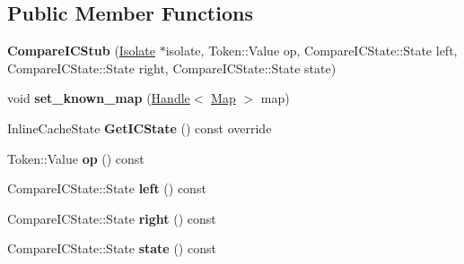 \subsection*{Public Member Functions}
\begin{DoxyCompactItemize}
\item 
{\bfseries Compare\+I\+C\+Stub} (\hyperlink{classv8_1_1internal_1_1_isolate}{Isolate} $\ast$isolate, Token\+::\+Value op, Compare\+I\+C\+State\+::\+State left, Compare\+I\+C\+State\+::\+State right, Compare\+I\+C\+State\+::\+State state)\hypertarget{classv8_1_1internal_1_1_compare_i_c_stub_aafde2681542478f51d0f73f981364d45}{}\label{classv8_1_1internal_1_1_compare_i_c_stub_aafde2681542478f51d0f73f981364d45}

\item 
void {\bfseries set\+\_\+known\+\_\+map} (\hyperlink{classv8_1_1internal_1_1_handle}{Handle}$<$ \hyperlink{classv8_1_1internal_1_1_map}{Map} $>$ map)\hypertarget{classv8_1_1internal_1_1_compare_i_c_stub_a5f3d7ea225296e08b25c2b9ada8f31d4}{}\label{classv8_1_1internal_1_1_compare_i_c_stub_a5f3d7ea225296e08b25c2b9ada8f31d4}

\item 
Inline\+Cache\+State {\bfseries Get\+I\+C\+State} () const  override\hypertarget{classv8_1_1internal_1_1_compare_i_c_stub_a64563ecf68c3186758801ebb704c4659}{}\label{classv8_1_1internal_1_1_compare_i_c_stub_a64563ecf68c3186758801ebb704c4659}

\item 
Token\+::\+Value {\bfseries op} () const \hypertarget{classv8_1_1internal_1_1_compare_i_c_stub_a76bc90148383ebf2392a60eefcd48448}{}\label{classv8_1_1internal_1_1_compare_i_c_stub_a76bc90148383ebf2392a60eefcd48448}

\item 
Compare\+I\+C\+State\+::\+State {\bfseries left} () const \hypertarget{classv8_1_1internal_1_1_compare_i_c_stub_ab8e254cdd20e62a7191aeb01c943c904}{}\label{classv8_1_1internal_1_1_compare_i_c_stub_ab8e254cdd20e62a7191aeb01c943c904}

\item 
Compare\+I\+C\+State\+::\+State {\bfseries right} () const \hypertarget{classv8_1_1internal_1_1_compare_i_c_stub_ae5757c1e2a768f8c93db357fd9295ce6}{}\label{classv8_1_1internal_1_1_compare_i_c_stub_ae5757c1e2a768f8c93db357fd9295ce6}

\item 
Compare\+I\+C\+State\+::\+State {\bfseries state} () const \hypertarget{classv8_1_1internal_1_1_compare_i_c_stub_a59dab9cbdc4879b75a465044c9d5c4b8}{}\label{classv8_1_1internal_1_1_compare_i_c_stub_a59dab9cbdc4879b75a465044c9d5c4b8}

\end{DoxyCompactItemize}
